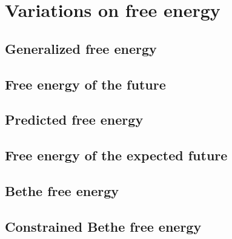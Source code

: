 \chapter{Variations on free energy}

\section{Generalized free energy}
\section{Free energy of the future}
\section{Predicted free energy}
\section{Free energy of the expected future}
\section{Bethe free energy}
\section{Constrained Bethe free energy}